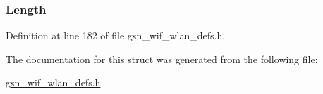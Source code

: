 \hypertarget{a00415_a92c9c711d62ad0b99ad1f6c2a94f7bc2}{
\subsubsection[{Length}]{ {\bf Length}}}
\label{a00415_a92c9c711d62ad0b99ad1f6c2a94f7bc2}


Definition at line 182 of file gsn\_\-wif\_\-wlan\_\-defs.h.



The documentation for this struct was generated from the following file:\begin{DoxyCompactItemize}
\item 
\hyperlink{a00613}{gsn\_\-wif\_\-wlan\_\-defs.h}\end{DoxyCompactItemize}
